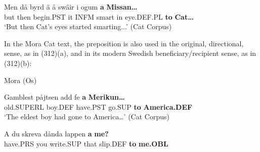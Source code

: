  \ea\label{}
\gll Men  då  byrd  ä  å  swäir  i  ogum  \textbf{a} \textbf{Missan…}\\


but  then  begin.PST  it  INFM  smart  in  eye.DEF.PL  \textbf{to} \textbf{Cat…}\\

\glt ‘But then Cat’s eyes started smarting...’ (Cat Corpus)

\z

In the Mora Cat text, the preposition is also used in the original, directional, sense, as in (312)(a), and in its modern Swedish beneficiary/recipient sense, as in (312)(b):


\item 

\label{bkm:Ref135470190}Mora (Os)



\item 


 \ea\label{}
\gll Gamblest  påjtsen  add  fe  \textbf{a} \textbf{Merikun…}\\


old.SUPERL  boy.DEF  have.PST  go.SUP  \textbf{to} \textbf{America.DEF}\\

\glt ‘The eldest boy had gone to America…’ (Cat Corpus)

\z

\item 


 \ea\label{}
\gll A  du  skreva  dånda  lappen  \textbf{a} \textbf{me?}\\


have.PRS  you  write.SUP  that  slip.DEF  \textbf{to} \textbf{me.OBL}\\

